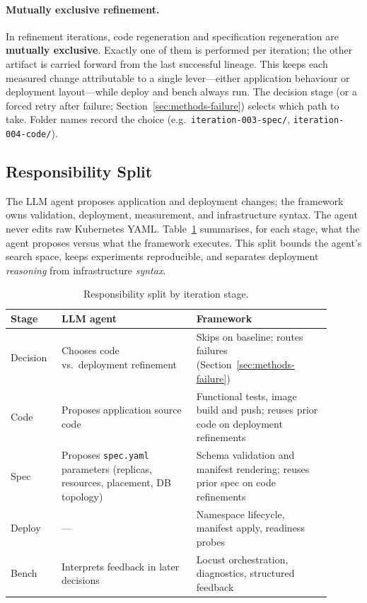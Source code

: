 \paragraph{Mutually exclusive refinement.}
In refinement iterations, code regeneration and specification regeneration are
\textbf{mutually exclusive}.  Exactly one of them is performed per iteration;
the other artifact is carried forward from the last successful lineage.  This
keeps each measured change attributable to a single lever---either application
behaviour or deployment layout---while deploy and bench always run.
The decision stage (or a forced retry after failure; Section~\ref{sec:methods-failure})
selects which path to take.  Folder names record the choice (e.g.\
\texttt{iteration-003-spec/}, \texttt{iteration-004-code/}).

\subsection{Responsibility Split}
\label{sec:methods-responsibility}

The LLM agent proposes application and deployment changes; the framework owns
validation, deployment, measurement, and infrastructure syntax. The agent never
edits raw Kubernetes YAML. Table~\ref{tab:responsibility-split} summarises, for
each stage, what the agent proposes versus what the framework executes. This
split bounds the agent's search space, keeps experiments reproducible, and
separates deployment \emph{reasoning} from infrastructure \emph{syntax}.

\begin{table}[htbp]
  \centering
  \caption{Responsibility split by iteration stage.}
  \label{tab:responsibility-split}
  \small
  \begin{tabular}{@{}p{0.14\linewidth} p{0.38\linewidth} p{0.38\linewidth}@{}}
    \toprule
    \textbf{Stage} & \textbf{LLM agent} & \textbf{Framework} \\
    \midrule
    Decision &
      Chooses code vs.\ deployment refinement &
      Skips on baseline; routes failures
        (Section~\ref{sec:methods-failure}) \\
    Code &
      Proposes application source code &
      Functional tests, image build and push;
      reuses prior code on deployment refinements \\
    Spec &
      Proposes \texttt{spec.yaml} parameters
      (replicas, resources, placement, DB topology) &
      Schema validation and manifest rendering;
      reuses prior spec on code refinements \\
    Deploy &
      --- &
      Namespace lifecycle, manifest apply,
      readiness probes \\
    Bench &
      Interprets feedback in later decisions &
      Locust orchestration, diagnostics,
      structured feedback \\
    \bottomrule
  \end{tabular}
\end{table}

